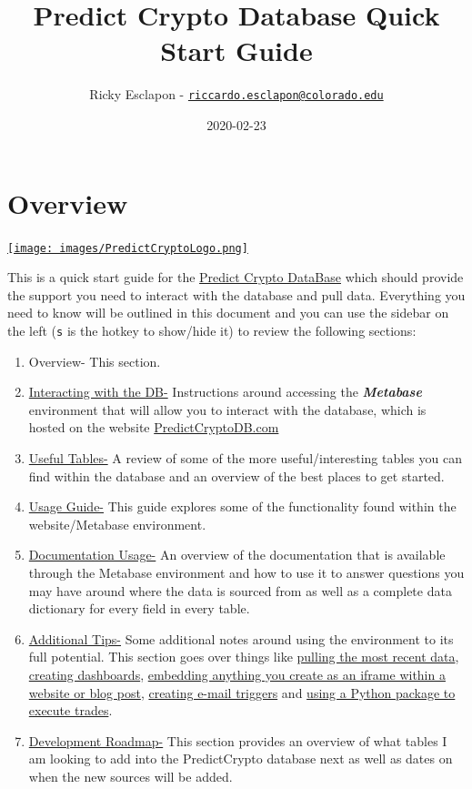 \documentclass[
]{book}
\title{Predict Crypto Database Quick Start Guide}
\author{Ricky Esclapon - \href{mailto:riccardo.esclapon@colorado.edu}{\nolinkurl{riccardo.esclapon@colorado.edu}}}
\date{2020-02-23}
\begin{document}
\maketitle

{
\setcounter{tocdepth}{1}
\tableofcontents
}
\hypertarget{overview}{%
\chapter{Overview}\label{overview}}

\href{https://predictcryptodb.com}{\texttt{[image: images/PredictCryptoLogo.png]}}

This is a quick start guide for the \href{https://predictcryptodb.com}{Predict Crypto DataBase} which should provide the support you need to interact with the database and pull data. Everything you need to know will be outlined in this document and you can use the sidebar on the left (\texttt{s} is the hotkey to show/hide it) to review the following sections:

\begin{enumerate}
\def\labelenumi{\arabic{enumi}.}
\item
  Overview- This section.
\item
  \protect\hyperlink{interacting-with-the-db}{Interacting with the DB-} Instructions around accessing the \textbf{\emph{Metabase}} environment that will allow you to interact with the database, which is hosted on the website \href{https://predictcryptodb.com}{PredictCryptoDB.com}
\item
  \protect\hyperlink{useful-tables}{Useful Tables-} A review of some of the more useful/interesting tables you can find within the database and an overview of the best places to get started.
\item
  \protect\hyperlink{usage-guide}{Usage Guide-} This guide explores some of the functionality found within the website/Metabase environment.
\item
  \protect\hyperlink{documentation-usage}{Documentation Usage-} An overview of the documentation that is available through the Metabase environment and how to use it to answer questions you may have around where the data is sourced from as well as a complete data dictionary for every field in every table.
\item
  \protect\hyperlink{additional-tips}{Additional Tips-} Some additional notes around using the environment to its full potential. This section goes over things like \protect\hyperlink{pulling-most-recent-data}{pulling the most recent data}, \protect\hyperlink{creating-dashboards}{creating dashboards}, \protect\hyperlink{embedding-anything-created-on-metabase}{embedding anything you create as an iframe within a website or blog post}, \protect\hyperlink{creating-e-mail-triggers}{creating e-mail triggers} and \protect\hyperlink{using-the-shrimpy-python-library}{using a Python package to execute trades}.
\item
  \protect\hyperlink{development-roadmap}{Development Roadmap-} This section provides an overview of what tables I am looking to add into the PredictCrypto database next as well as dates on when the new sources will be added.
\end{enumerate}
\end{document}
